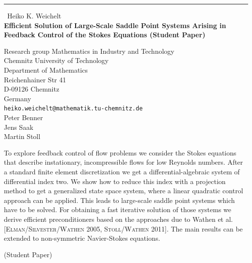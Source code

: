 \documentclass{report}
\begin{document}
\begin{center}
\rule{6in}{1pt} \
{\large Heiko K. Weichelt \\
{\bf Efficient Solution of Large-Scale Saddle Point Systems Arising in Feedback Control of the Stokes Equations (Student Paper)}}

Research group Mathematics in Industry and Technology \\ Chemnitz University of Technology \\ Department of Mathematics \\ Reichenhainer Str 41 \\ D-09126 Chemnitz \\ Germany
\\
{\tt heiko.weichelt@mathematik.tu-chemnitz.de}\\
Peter Benner\\
Jens Saak\\
Martin Stoll\end{center}

To explore feedback control of flow problems we consider the Stokes
equations that describe instationary, incompressible flows for low
Reynolds numbers. After a standard finite element discretization we get a
differential-algebraic system of
differential index two. We show how to reduce this index with a
projection method to get a generalized state space system, where a
linear quadratic control approach can be applied. This leads to
large-scale saddle point systems which have to be solved. For obtaining a
fast iterative solution of those systems we derive efficient
preconditioners based on the approaches due to Wathen et al.
[\textsc{Elman/Silvester/Wathen 2005, Stoll/Wathen 2011}]. The main
results can be extended to non-symmetric Navier-Stokes equations.

(Student Paper)
\end{document}
